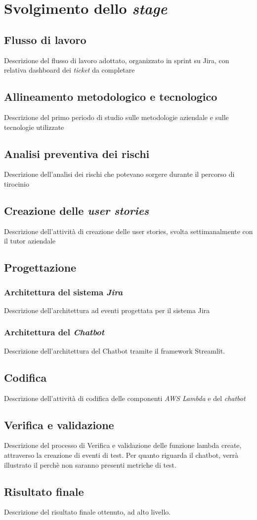 \chapter{Svolgimento dello \textit{stage}}
\label{cap:descrizione-stage}

\section{Flusso di lavoro}
Descrizione del flusso di lavoro adottato, organizzato in sprint su Jira, con relativa dashboard dei \textit{ticket} da completare
\section{Allineamento metodologico e tecnologico}
Descrizione del primo periodo di studio sulle metodologie aziendale e sulle tecnologie utilizzate
\section{Analisi preventiva dei rischi}
Descrizione dell'analisi dei rischi che potevano sorgere durante il percorso di tirocinio
\section{Creazione delle \textit{user stories}}
Descrizione dell'attività di creazione delle user stories, svolta settimanalmente con il tutor aziendale
\section{Progettazione}
\subsection{Architettura del sistema \textit{Jira}}
Descrizione dell'architettura ad eventi progettata per il sistema Jira
\subsection{Architettura del \textit{Chatbot}}
Descrizione dell'architettura del Chatbot tramite il framework Streamlit.
\section{Codifica}
Descrizione dell'attività di codifica delle componenti \textit{AWS Lambda} e del \textit{chatbot}
\section{Verifica e validazione}
Descrizione del processo di Verifica e validazione delle funzione lambda create, attraverso la creazione di eventi di test.
Per quanto riguarda il chatbot, verrà illustrato il perchè non saranno presenti metriche di test.

\section{Risultato finale}
Descrizione del risultato finale ottenuto, ad alto livello.